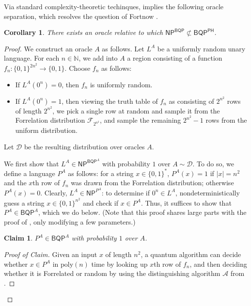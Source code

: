 \documentclass[11pt]{article}%
\newtheorem{claim}[theorem]{Claim}
\newtheorem{corollary}[theorem]{Corollary}
\newcommand{\Naturals}{\mathbb{N}}
\newcommand{\poly}{\mathrm{poly}}
\begin{document}
Via standard complexity-theoretic techinques,  implies the following oracle separation, which resolves the question of Fortnow \cite{For05}.

\begin{corollary}
\label{cor:np^bqp_not_in_bqp^ph}
There exists an oracle relative to which $\mathsf{NP}^{\mathsf{BQP}%
}\not \subset \mathsf{BQP}^{\mathsf{PH}}$.
\end{corollary}

\begin{proof}
We construct an oracle $A$ as follows. Let $L^A$ be a uniformly random unary language. For each $n \in \Naturals$, we add into $A$ a region consisting of a function $f_n: \{0,1\}^{2n^2} \to \{0,1\}$. Choose $f_n$ as follows:
\begin{itemize}
\item If $L^A\left(0^n\right) = 0$, then $f_n$ is uniformly random.
\item If $L^A\left(0^n\right) = 1$, then viewing the truth table of $f_n$ as consisting of $2^{n^2}$ rows of length $2^{n^2}$, we pick a single row at random and sample it from the Forrelation distribution $\mathcal{F}_{2^{n^2}}$, and sample the remaining $2^{n^2} - 1$ rows from the uniform distribution.
\end{itemize}
Let $\mathcal{D}$ be the resulting distribution over oracles $A$.

We first show that $L^A \in \mathsf{NP}^{\mathsf{BQP}^A}$ with probability $1$ over $A \sim \mathcal{D}$. To do so, we define a language $P^A$ as follows: for a string $x \in \{0,1\}^*$, $P^A(x) = 1$ if $|x| = n^2$ and the $x$th row of $f_n$ was drawn from the Forrelation distribution; otherwise $P^A(x) = 0$. Clearly, $L^A \in \mathsf{NP}^{P^A}$: to determine if $0^n \in L^A$, nondeterministically guess a string $x \in \{0,1\}^{n^2}$ and check if $x \in P^A$. Thus, it suffices to show that $P^A \in \mathsf{BQP}^A$, which we do below. (Note that this proof shares large parts with the proof of , only modifying a few parameters.)

\begin{claim}
\label{claim:m_in_bqp_o}
$P^A \in \mathsf{BQP}^A$ with probability $1$ over $A$.
\end{claim}

\begin{proof}[Proof of Claim]
Given an input $x$ of length $n^2$, a quantum algorithm can decide whether $x \in P^A$ in $\poly(n)$ time by looking up $x$th row of $f_n$, and then deciding whether it is Forrelated or random by using the distinguishing algorithm $\mathcal{A}$ from .


\end{proof}
\end{proof}
\end{document}
